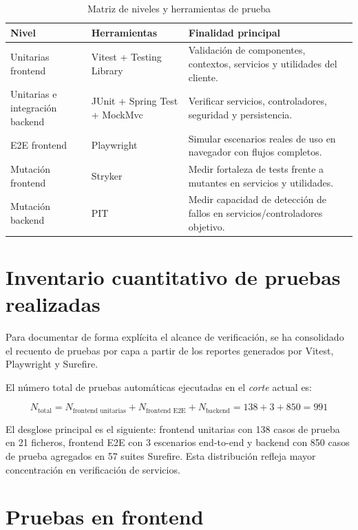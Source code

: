 \begin{table}[!htbp]
\centering
\begin{tabular}{|P{2.9cm}|P{3.6cm}|P{5.4cm}|}
\hline
\textbf{Nivel} & \textbf{Herramientas} & \textbf{Finalidad principal} \\
\hline
Unitarias frontend & Vitest + Testing Library & Validaci\'on de componentes, contextos, servicios y utilidades del cliente. \\
\hline
Unitarias e integraci\'on backend & JUnit + Spring Test + MockMvc & Verificar servicios, controladores, seguridad y persistencia. \\
\hline
E2E frontend & Playwright & Simular escenarios reales de uso en navegador con flujos completos. \\
\hline
Mutaci\'on frontend & Stryker & Medir fortaleza de tests frente a mutantes en servicios y utilidades. \\
\hline
Mutaci\'on backend & PIT & Medir capacidad de detecci\'on de fallos en servicios/controladores objetivo. \\
\hline
\end{tabular}
\caption{Matriz de niveles y herramientas de prueba}
\label{tab:matriz-pruebas}
\end{table}

\FloatBarrier
\section{Inventario cuantitativo de pruebas realizadas}

Para documentar de forma expl\'icita el alcance de verificaci\'on,
se ha consolidado el recuento de pruebas por capa a partir de los reportes
generados por Vitest, Playwright y Surefire.

El n\'umero total de pruebas autom\'aticas ejecutadas en el \textit{corte} actual es:

\[
N_{\text{total}} = N_{\text{frontend unitarias}} + N_{\text{frontend E2E}} + N_{\text{backend}} = 138 + 3 + 850 = 991
\]

El desglose principal es el siguiente: frontend unitarias con 138 casos de prueba en 21 ficheros, frontend E2E con 3 escenarios end-to-end y backend con 850 casos de prueba agregados en 57 suites Surefire. Esta distribuci\'on refleja mayor concentraci\'on en verificaci\'on de servicios.

\FloatBarrier
\section{Pruebas en frontend}

